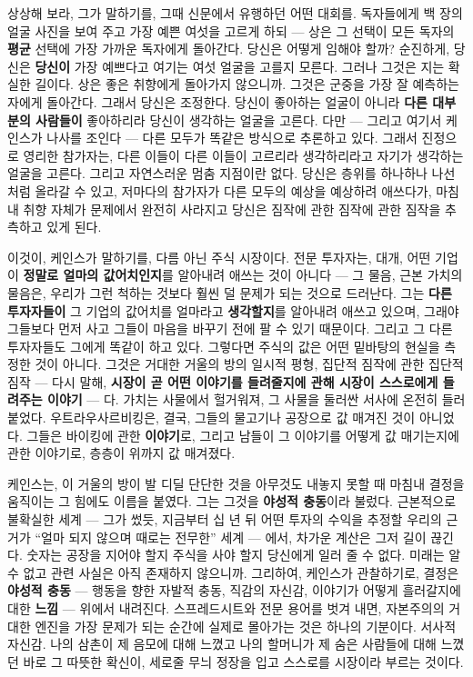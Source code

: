 상상해 보라, 그가 말하기를, 그때 신문에서 유행하던 어떤 대회를. 독자들에게 백 장의 얼굴 사진을 보여 주고 가장 예쁜 여섯을 고르게 하되 — 상은 그 선택이 모든 독자의 \textbf{평균} 선택에 가장 가까운 독자에게 돌아간다. 당신은 어떻게 임해야 할까? 순진하게, 당신은 \textbf{당신이} 가장 예쁘다고 여기는 여섯 얼굴을 고를지 모른다. 그러나 그것은 지는 확실한 길이다. 상은 좋은 취향에게 돌아가지 않으니까. 그것은 군중을 가장 잘 예측하는 자에게 돌아간다. 그래서 당신은 조정한다. 당신이 좋아하는 얼굴이 아니라 \textbf{다른 대부분의 사람들이} 좋아하리라 당신이 생각하는 얼굴을 고른다. 다만 — 그리고 여기서 케인스가 나사를 조인다 — 다른 모두가 똑같은 방식으로 추론하고 있다. 그래서 진정으로 영리한 참가자는, 다른 이들이 다른 이들이 고르리라 생각하리라고 자기가 생각하는 얼굴을 고른다. 그리고 자연스러운 멈춤 지점이란 없다. 당신은 층위를 하나하나 나선처럼 올라갈 수 있고, 저마다의 참가자가 다른 모두의 예상을 예상하려 애쓰다가, 마침내 취향 자체가 문제에서 완전히 사라지고 당신은 짐작에 관한 짐작에 관한 짐작을 추측하고 있게 된다.

이것이, 케인스가 말하기를, 다름 아닌 주식 시장이다. 전문 투자자는, 대개, 어떤 기업이 \textbf{정말로 얼마의 값어치인지}를 알아내려 애쓰는 것이 아니다 — 그 물음, 근본 가치의 물음은, 우리가 그런 척하는 것보다 훨씬 덜 문제가 되는 것으로 드러난다. 그는 \textbf{다른 투자자들이} 그 기업의 값어치를 얼마라고 \textbf{생각할지}를 알아내려 애쓰고 있으며, 그래야 그들보다 먼저 사고 그들이 마음을 바꾸기 전에 팔 수 있기 때문이다. 그리고 그 다른 투자자들도 그에게 똑같이 하고 있다. 그렇다면 주식의 값은 어떤 밑바탕의 현실을 측정한 것이 아니다. 그것은 거대한 거울의 방의 일시적 평형, 집단적 짐작에 관한 집단적 짐작 — 다시 말해, \textbf{시장이 곧 어떤 이야기를 들려줄지에 관해 시장이 스스로에게 들려주는 이야기} — 다. 가치는 사물에서 헐거워져, 그 사물을 둘러싼 서사에 온전히 들러붙었다. 우트라우사르비킹은, 결국, 그들의 물고기나 공장으로 값 매겨진 것이 아니었다. 그들은 바이킹에 관한 \textbf{이야기}로, 그리고 남들이 그 이야기를 어떻게 값 매기는지에 관한 이야기로, 층층이 위까지 값 매겨졌다.

케인스는, 이 거울의 방이 발 디딜 단단한 것을 아무것도 내놓지 못할 때 마침내 결정을 움직이는 그 힘에도 이름을 붙였다. 그는 그것을 \textbf{야성적 충동}이라 불렀다. 근본적으로 불확실한 세계 — 그가 썼듯, 지금부터 십 년 뒤 어떤 투자의 수익을 추정할 우리의 근거가 ``얼마 되지 않으며 때로는 전무한'' 세계 — 에서, 차가운 계산은 그저 길이 끊긴다. 숫자는 공장을 지어야 할지 주식을 사야 할지 당신에게 일러 줄 수 없다. 미래는 알 수 없고 관련 사실은 아직 존재하지 않으니까. 그리하여, 케인스가 관찰하기로, 결정은 \textbf{야성적 충동} — 행동을 향한 자발적 충동, 직감의 자신감, 이야기가 어떻게 흘러갈지에 대한 \textbf{느낌} — 위에서 내려진다. 스프레드시트와 전문 용어를 벗겨 내면, 자본주의의 거대한 엔진을 가장 문제가 되는 순간에 실제로 몰아가는 것은 하나의 기분이다. 서사적 자신감. 나의 삼촌이 제 음모에 대해 느꼈고 나의 할머니가 제 숨은 사람들에 대해 느꼈던 바로 그 따뜻한 확신이, 세로줄 무늬 정장을 입고 스스로를 시장이라 부르는 것이다.

